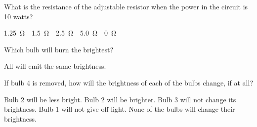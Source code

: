 \documentclass{../../oss-apphys-exam}
\newcounter{lastmc}
\begin{document}
\begin{multicols}{2}
\begin{questions}
    \question What is the resistance of the adjustable resistor when the power
    in the circuit is 10 watts?
    \label{adjust2}
    \begin{choices}
      \choice\SI{1.25}\ohm
      \choice\SI{1.5}\ohm
      \choice\SI{2.5}\ohm
      \choice\SI{5.0}\ohm
      \choice\SI{0}\ohm
    \end{choices}    
    
%
%
    
    \question Which bulb will burn the brightest?
    \label{bulb1}
    \begin{choices}
       \choice All will emit the same brightness.
    \end{choices}
    \vspace{.7in}
    
    \question If bulb 4 is removed, how will the brightness of each of the bulbs
    change, if at all?
    \label{bulb2}
    \begin{choices}
      \choice Bulb 2 will be less bright.
      \choice Bulb 2 will be brighter.
      \choice Bulb 3 will not change its brightness.
      \choice Bulb 1 will not give off light.
      \choice None of the bulbs will change their brightness.
    \end{choices}
  \end{questions}
  \setcounter{lastmc}{\value{question}}
\end{multicols}
\newpage
\end{document}
